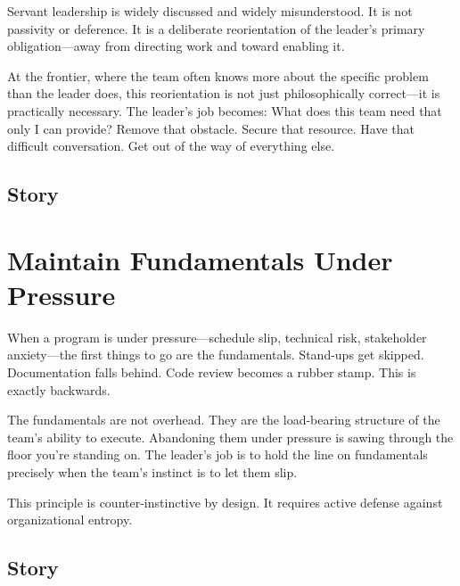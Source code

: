 
Servant leadership is widely discussed and widely misunderstood. It is not
passivity or deference. It is a deliberate reorientation of the leader's
primary obligation---away from directing work and toward enabling it.

At the frontier, where the team often knows more about the specific problem
than the leader does, this reorientation is not just philosophically correct---it
is practically necessary. The leader's job becomes: What does this team need that
only I can provide? Remove that obstacle. Secure that resource. Have that difficult
conversation. Get out of the way of everything else.

\subsection{Story}

\section{Maintain Fundamentals Under Pressure}


When a program is under pressure---schedule slip, technical risk, stakeholder
anxiety---the first things to go are the fundamentals. Stand-ups get skipped.
Documentation falls behind. Code review becomes a rubber stamp.
This is exactly backwards.

The fundamentals are not overhead. They are the load-bearing structure of the
team's ability to execute. Abandoning them under pressure is sawing through the
floor you're standing on. The leader's job is to hold the line on fundamentals
precisely when the team's instinct is to let them slip.

This principle is counter-instinctive by design. It requires active defense
against organizational entropy.

\subsection{Story}

